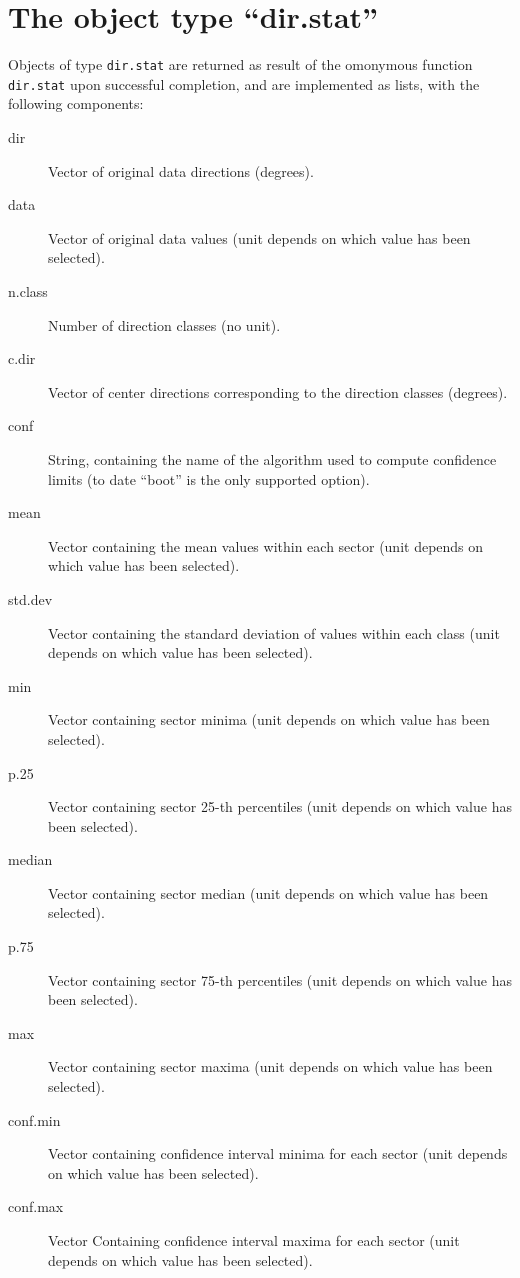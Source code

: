 \documentclass[a4paper,10pt]{book}
\begin{document}
\section{The object type ``dir.stat''}
\label{sec:dir.stat}

Objects of type \verb|dir.stat| are returned as result of the omonymous function \verb|dir.stat| upon successful completion, and are implemented as lists, with the following components:

\begin{description}
 \item[dir] Vector of original data directions (degrees).
 \item[data] Vector of original data values (unit depends on which value has been selected).
 \item[n.class] Number of direction classes (no unit).
 \item[c.dir] Vector of center directions corresponding to the direction classes (degrees).
 \item[conf] String, containing the name of the algorithm used to compute confidence limits (to date ``boot'' is the only supported option).
 \item[mean] Vector containing the mean values within each sector (unit depends on which value has been selected).
 \item[std.dev] Vector containing the standard deviation of values within each class (unit depends on which value has been selected).
 \item[min] Vector containing sector minima (unit depends on which value has been selected).
 \item[p.25] Vector containing sector 25-th percentiles (unit depends on which value has been selected).
 \item[median] Vector containing sector median (unit depends on which value has been selected).
 \item[p.75] Vector containing sector 75-th percentiles (unit depends on which value has been selected).
 \item[max] Vector containing sector maxima (unit depends on which value has been selected).
 \item[conf.min] Vector containing confidence interval minima for each sector (unit depends on which value has been selected).
 \item[conf.max] Vector Containing confidence interval maxima for each sector (unit depends on which value has been selected).
\end{description}
\end{document}
